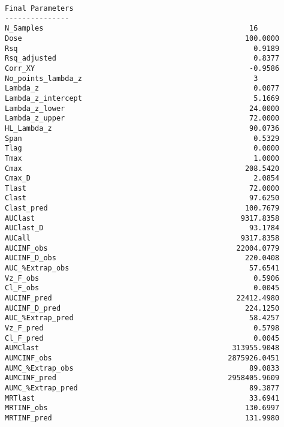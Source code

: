 \documentclass[12pt,a4paper]{article}
\begin{document}
\begin{verbatim}
Final Parameters
---------------
N_Samples                                                16
Dose                                                    100.0000
Rsq                                                       0.9189
Rsq_adjusted                                              0.8377
Corr_XY                                                  -0.9586
No_points_lambda_z                                        3
Lambda_z                                                  0.0077
Lambda_z_intercept                                        5.1669
Lambda_z_lower                                           24.0000
Lambda_z_upper                                           72.0000
HL_Lambda_z                                              90.0736
Span                                                      0.5329
Tlag                                                      0.0000
Tmax                                                      1.0000
Cmax                                                    208.5420
Cmax_D                                                    2.0854
Tlast                                                    72.0000
Clast                                                    97.6250
Clast_pred                                              100.7679
AUClast                                                9317.8358
AUClast_D                                                93.1784
AUCall                                                 9317.8358
AUCINF_obs                                            22004.0779
AUCINF_D_obs                                            220.0408
AUC_%Extrap_obs                                          57.6541
Vz_F_obs                                                  0.5906
Cl_F_obs                                                  0.0045
AUCINF_pred                                           22412.4980
AUCINF_D_pred                                           224.1250
AUC_%Extrap_pred                                         58.4257
Vz_F_pred                                                 0.5798
Cl_F_pred                                                 0.0045
AUMClast                                             313955.9048
AUMCINF_obs                                         2875926.0451
AUMC_%Extrap_obs                                         89.0833
AUMCINF_pred                                        2958405.9609
AUMC_%Extrap_pred                                        89.3877
MRTlast                                                  33.6941
MRTINF_obs                                              130.6997
MRTINF_pred                                             131.9980




\end{verbatim}
\end{document}
